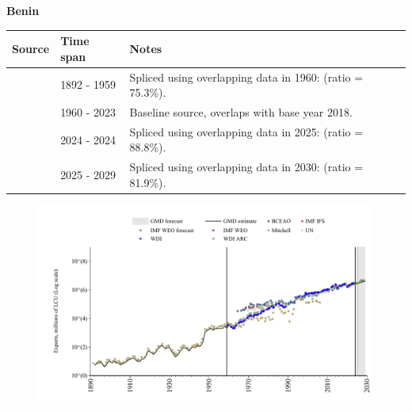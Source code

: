 \documentclass[12pt,a4paper,landscape]{article}
\begin{document}
\begin{adjustbox}{max totalsize={\paperwidth}{\paperheight},center}
\begin{minipage}[t][\textheight][t]{\textwidth}
\vspace*{0.5cm}
{}
\begin{center}
{\Large\bfseries Benin}
\end{center}
\vspace{0.5cm}
\begin{table}[H]
\centering
\small
\begin{tabular}{|l|l|l|}
\hline
\textbf{Source} & \textbf{Time span} & \textbf{Notes} \\
\hline
\rowcolor{white}\cite{Mitchell}& 1892 - 1959 &Spliced using overlapping data in 1960: (ratio = 75.3\%).\\
\rowcolor{lightgray}\cite{WDI}& 1960 - 2023 &Baseline source, overlaps with base year 2018.\\
\rowcolor{white}\cite{BCEAO}& 2024 - 2024 &Spliced using overlapping data in 2025: (ratio = 88.8\%).\\
\rowcolor{lightgray}\cite{IMF_WEO_forecast}& 2025 - 2029 &Spliced using overlapping data in 2030: (ratio = 81.9\%).\\
\hline
\end{tabular}
\end{table}
\begin{figure}[H]
\centering
\includegraphics[width=\textwidth,height=0.6\textheight,keepaspectratio]{graphs/BEN_exports.pdf}
\end{figure}
\end{minipage}
\end{adjustbox}
\end{document}
